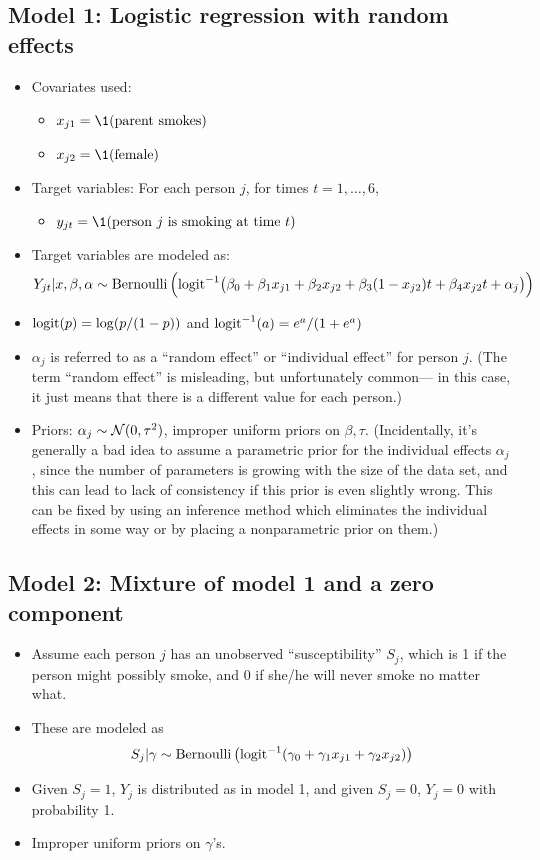 \documentclass[12pt]{article}
\begin{document}
\subsection*{Model 1: Logistic regression with random effects}
\begin{itemize}
\item Covariates used: 
\begin{itemize}
\item[] $x_{j 1} = \1(\text{parent smokes})$
\item[] $x_{j 2} = \1(\text{female})$
\end{itemize}
\item Target variables: For each person $j$, for times $t= 1,\ldots,6$,
\begin{itemize}
\item[] $y_{j t} = \1(\text{person $j$ is smoking at time $t$})$
\end{itemize}
\item Target variables are modeled as:
$$ Y_{j t}| x,\beta,\alpha\sim \operatorname*{Bernoulli}\Big(\mathrm{logit}^{-1}\big(\beta_0+ \beta_1 x_{j 1} + \beta_2 x_{j 2} + \beta_3(1 - x_{j 2}) t + \beta_4 x_{j 2} t + \alpha_j\big)\Big)$$
\item $\mathrm{logit}(p) = \log (p/(1 - p))$ and $\mathrm{logit}^{-1}(a) = e^a/(1+e^a)$
\item $\alpha_j$ is referred to as a ``random effect'' or ``individual effect'' for person $j$. (The term ``random effect'' is misleading, but unfortunately common--- in this case, it just means that there is a different value for each person.)
\item Priors: $\alpha_j \sim \mathcal{N}( 0,\tau^2)$, improper uniform priors on $\beta,\tau$. (Incidentally, it's generally a bad idea to assume a parametric prior for the individual effects $\alpha_j$, since the number of parameters is growing with the size of the data set, and this can lead to lack of consistency if this prior is even slightly wrong. This can be fixed by using an inference method which eliminates the individual effects in some way or by placing a nonparametric prior on them.)
\end{itemize}

\subsection*{Model 2: Mixture of model 1 and a zero component}
\begin{itemize}
\item Assume each person $j$ has an unobserved ``susceptibility'' $S_j$, which is 1 if the person might possibly smoke, and 0 if she/he will never smoke no matter what.
\item These are modeled as
$$  S_j|\gamma \sim \operatorname*{Bernoulli}\big(\mathrm{logit}^{-1}(\gamma_0+ \gamma_1 x_{j 1} + \gamma_2 x_{j 2}) \big) $$
\item Given $S_j = 1$, $Y_j$ is distributed as in model 1, and given $S_j = 0$, $Y_j = 0$ with probability 1.
\item Improper uniform priors on $\gamma$'s. 
\end{itemize}
\end{document}
